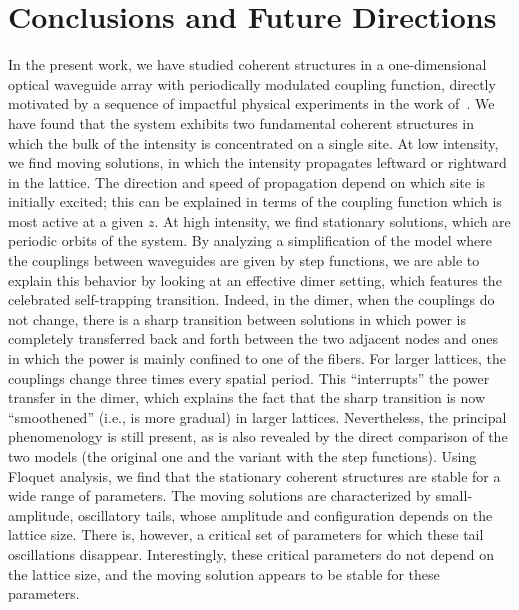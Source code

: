 \documentclass[reprint, amsmath,amssymb,aps,pre]{revtex4-2}
\begin{document}
\section{Conclusions and Future Directions}\label{sec:conclusions}

In the present work, we have studied coherent structures in a one-dimensional 
optical waveguide array with periodically modulated coupling function, directly
motivated by a sequence of impactful physical experiments in the work of~\cite{Mukherjee2020,recht21,PhysRevLett.128.113901,Jurgensen2021}. We have found that the system exhibits two fundamental coherent structures in which the bulk of the intensity is concentrated on a single site. At low intensity, we find moving solutions, in which the intensity propagates leftward or rightward in the lattice. The direction and speed of propagation depend on which site is initially excited; this can be explained in terms of the coupling function which is most active at a given $z$. At high intensity, we find stationary solutions, which are periodic orbits of the system. By analyzing a simplification of the model where the couplings between waveguides are given by step functions, we are able to explain this behavior by looking at an effective dimer setting, which features
the celebrated self-trapping transition.  Indeed, in the dimer, when the couplings do not change,  there is a sharp transition between solutions in which power is completely transferred back and forth between the two adjacent nodes and ones in which the power is mainly confined to one of the fibers. For larger lattices, the couplings change three times every spatial period. This ``interrupts'' the power transfer in the dimer, which explains the fact that the sharp transition is now ``smoothened'' (i.e., is more gradual) in larger lattices. 
Nevertheless, the principal phenomenology is still present, as is also revealed by the
direct comparison of the two models (the original one and the variant with the step functions).
Using Floquet analysis, we find that the stationary coherent structures are stable for a wide range of parameters. The moving solutions are characterized by small-amplitude, oscillatory tails, whose amplitude and configuration depends on the lattice size. There is, however, a critical set of parameters for which these tail oscillations disappear. Interestingly, these critical parameters do not depend on the lattice size, and the moving solution appears to be stable for these parameters.
\end{document}
